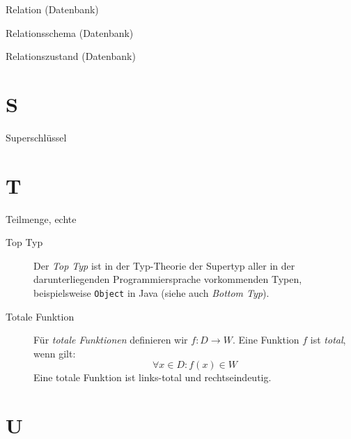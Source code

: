 \begin{description}
    \item[Relation (Datenbank)]
\end{description}

\begin{description}
    \item[Relationsschema (Datenbank)]
\end{description}


\begin{description}
    \item[Relationszustand (Datenbank)]
\end{description}


\section*{S}

\begin{description}
    \item[Superschlüssel]
\end{description}

\section*{T}

\begin{description}
    \item[Teilmenge, echte]
\end{description}

\begin{description}
    \item[Top Typ]
    Der \textit{Top Typ} ist in der Typ-Theorie der Supertyp aller in der darunterliegenden Programmiersprache vorkommenden Typen, beispielsweise \texttt{Object} in Java (siehe auch \textit{Bottom Typ}).
\end{description}

\begin{description}
    \item[Totale Funktion]
    Für \textit{totale Funktionen} definieren wir $f: D \rightarrow W$.
    Eine Funktion $f$ ist \textit{total}, wenn gilt:
    \[
        \forall x \in D: f(x) \in W
    \]
    \noindent
    Eine totale Funktion ist links-total und rechtseindeutig.
\end{description}

\section*{U}

